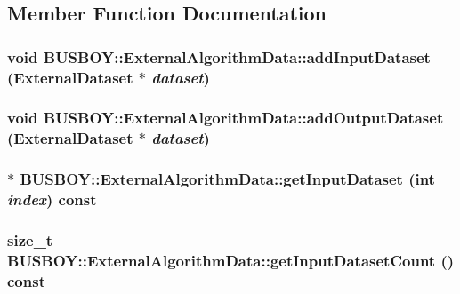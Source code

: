 \subsection{Member Function Documentation}
\hypertarget{classBUSBOY_1_1ExternalAlgorithmData_a48d0824fa9db5fcb88cd7fea8805af26}{
\subsubsection[{addInputDataset}]{\setlength{\rightskip}{0pt plus 5cm}void BUSBOY::ExternalAlgorithmData::addInputDataset ({\bf ExternalDataset} $\ast$ {\em dataset})}}
\label{classBUSBOY_1_1ExternalAlgorithmData_a48d0824fa9db5fcb88cd7fea8805af26}
\hypertarget{classBUSBOY_1_1ExternalAlgorithmData_a4a62d5e653eaeef0d6b38c32621c8f75}{
\subsubsection[{addOutputDataset}]{\setlength{\rightskip}{0pt plus 5cm}void BUSBOY::ExternalAlgorithmData::addOutputDataset ({\bf ExternalDataset} $\ast$ {\em dataset})}}
\label{classBUSBOY_1_1ExternalAlgorithmData_a4a62d5e653eaeef0d6b38c32621c8f75}
\hypertarget{classBUSBOY_1_1ExternalAlgorithmData_a04a0faf533e8810653f0ed993de7ffae}{
\subsubsection[{getInputDataset}]{ $\ast$ BUSBOY::ExternalAlgorithmData::getInputDataset (int {\em index}) const}}
\label{classBUSBOY_1_1ExternalAlgorithmData_a04a0faf533e8810653f0ed993de7ffae}
\hypertarget{classBUSBOY_1_1ExternalAlgorithmData_a077b4e0b405fe7332c95f47879eec165}{
\subsubsection[{getInputDatasetCount}]{\setlength{\rightskip}{0pt plus 5cm}size\_\-t BUSBOY::ExternalAlgorithmData::getInputDatasetCount () const}}
